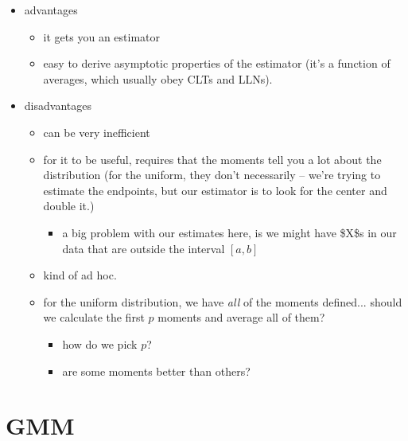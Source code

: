 \begin{itemize}
\item advantages
\begin{itemize}
\item it gets you an estimator
\item easy to derive asymptotic properties of the estimator (it's a
         function of averages, which usually obey CLTs and LLNs).
\end{itemize}
\item disadvantages
\begin{itemize}
\item can be very inefficient
\item for it to be useful, requires that the moments tell you a lot
         about the distribution (for the uniform, they don't
         necessarily -- we're trying to estimate the endpoints, but our
         estimator is to look for the center and double it.)
\begin{itemize}
\item a big problem with our estimates here, is we might have \$X\$s
           in our data that are outside the interval $[a,b]$
\end{itemize}
\item kind of ad hoc.
\item for the uniform distribution, we have \emph{all} of the moments
         defined... should we calculate the first $p$ moments and
         average all of them?
\begin{itemize}
\item how do we pick $p$?
\item are some moments better than others?
\end{itemize}
\end{itemize}
\end{itemize}

\section{GMM}

